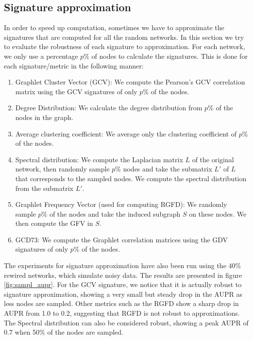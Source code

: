 \subsection{Signature approximation}

In order to speed up computation, sometimes we have to approximate the signatures that are computed for all the random networks. In this section we try to evaluate the robustness of each signature to approximation. For each network, we only use a percentage $p\%$ of nodes to calculate the signatures. This is done for each signature/metric in the following manner:
\begin{enumerate}
 \item Graphlet Cluster Vector (GCV): We compute the Pearson's GCV correlation matrix using the GCV signatures of only $p\%$ of the nodes.
 \item Degree Distribution: We calculate the degree distribution from $p\%$ of the nodes in the graph.
 \item Average clustering coefficient: We average only the clustering coefficient of $p\%$ of the nodes.
 \item Spectral distribution: We compute the Laplacian matrix $L$ of the original network, then randomly sample $p\%$ nodes and take the submatrix $L'$ of $L$ that corresponds to the sampled nodes. We compute the spectral distribution from the submatrix $L'$.
 \item Graphlet Frequency Vector (used for computing RGFD): We randomly sample $p\%$ of the nodes and take the induced subgraph $S$ on these nodes. We then compute the GFV in $S$.
 \item GCD73: We compute the Graphlet correlation matrices using the GDV signatures of only $p\%$ of the nodes.  
\end{enumerate}

The experiments for signature approximation have also been run using the 40\% rewired networks, which simulate noisy data. The results are presented in figure \ref{fig:sampl_aupr}. For the GCV signature, we notice that it is actually robust to signature approximation, showing a very small but steady drop in the AUPR as less nodes are sampled. Other metrics such as the RGFD show a sharp drop in AUPR from 1.0 to 0.2, suggesting that RGFD is not robust to approximations. The Spectral distribution can also be considered robust, showing a peak AUPR of 0.7 when 50\% of the nodes are sampled. 

